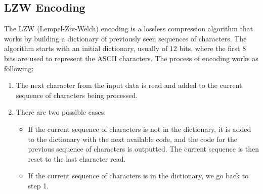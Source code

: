 \subsection{LZW Encoding}

The LZW (Lempel-Ziv-Welch) encoding is a lossless compression algorithm that works by building a dictionary of previously seen sequences of characters. The algorithm starts with an initial dictionary, usually of $12$ bits, where the first $8$ bits are used to represent the ASCII characters. The process of encoding works as following:
\begin{enumerate}
    \item The next character from the input data is read and added to the current sequence of characters being processed.
    \item There are two possible cases:
    \begin{itemize}
        \item If the current sequence of characters is not in the dictionary, it is added to the dictionary with the next available code, and the code for the previous sequence of characters is outputted. The current sequence is then reset to the last character read.
        \item If the current sequence of characters is in the dictionary, we go back to step 1.
    \end{itemize}
\end{enumerate}

